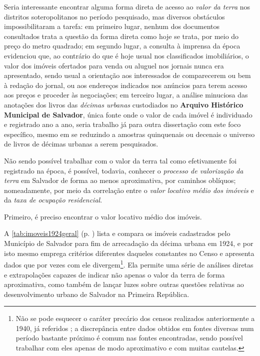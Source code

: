 Seria interessante encontrar alguma forma direta de acesso ao \textit{valor da terra} nos distritos soteropolitanos no período pesquisado, mas diversos obstáculos impossibilitaram a tarefa: em primeiro lugar, nenhum dos documentos consultados trata a questão da forma direta como hoje se trata, por meio do preço do metro quadrado; em segundo lugar, a consulta à imprensa da época evidenciou que, ao contrário do que é hoje usual nos classificados imobiliários, o valor dos imóveis ofertados para venda ou aluguel nos jornais nunca era apresentado, sendo usual a orientação aos interessados de comparecerem ou bem à redação do jornal, ou aos endereços indicados nos anúncios para terem acesso aos preços e proceder às negociações; em terceiro lugar, a análise minuciosa das anotações dos livros das \textit{décimas urbanas} custodiados no \textbf{Arquivo Histórico Municipal de Salvador}, única fonte onde o valor de cada imóvel é individuado e registrado ano a ano, seria trabalho já para outra dissertação com este foco específico, mesmo em se reduzindo a amostras quinquenais ou decenais o universo de livros de décimas urbanas a serem pesquisados.

Não sendo possível trabalhar com o valor da terra tal como efetivamente foi registrado na época, é possível, todavia, conhecer o \textit{processo de valorização da terra} em Salvador de forma ao menos aproximativa, por caminhos oblíquos; nomeadamente, por meio da correlação entre o \textit{valor locativo médio dos imóveis} e da \textit{taxa de ocupação residencial}.

Primeiro, é preciso encontrar o valor locativo médio dos imóveis. 

A \autoref{tab:imoveis1924geral} (p. \pageref{tab:imoveis1924geral}) lista e compara os imóveis cadastrados pelo Município de Salvador para fim de arrecadação da décima urbana em 1924, e por isto mesmo emprega critérios diferentes daqueles constantes no Censo e apresenta dados que por vezes com ele divergem\footnote{Não se pode esquecer o caráter precário dos censos realizados anteriormente a 1940, já referidos \cite{oliveirasimoes_censos_2005, reisetal_areascensos_2011}; a discrepância entre dados obtidos em fontes diversas num período bastante próximo é comum nas fontes encontradas, sendo possível trabalhar com eles apenas de modo aproximativo e com muitas cautelas.}. Ela permite uma série de análises diretas e extrapolações capazes de indicar não apenas o valor da terra de forma aproximativa, como também de lançar luzes sobre outras questões relativas ao desenvolvimento urbano de Salvador na Primeira República.

